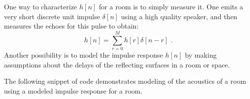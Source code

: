 One way to characterize $h[n]$ for a room is to simply measure it. One
emits a very short discrete unit impulse $\delta[n]$ using a high
quality speaker, and then measures the echoes for this pulse to
obtain:
\begin{equation}
h[n] = \sum_{r=0}^M h[r]\delta[n-r]\,\,.
\end{equation}
Another possibility is to model the impulse response $h[n]$ by making
assumptions about the delays of the reflecting surfaces in a room or
space.

The following snippet of code demonstrates modeling of the acoustics
of a room using a modeled impulse response for a room.

